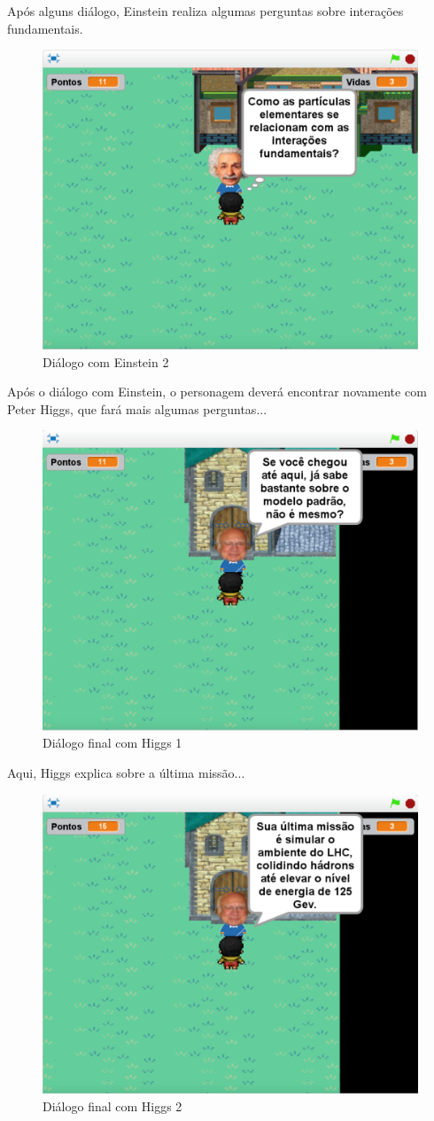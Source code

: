 \documentclass[12pt,fleqn]{book} %
\begin{document}
\newpage

Após alguns diálogo, Einstein realiza algumas perguntas sobre interações fundamentais.

\begin{figure}[h]
	\centering
	\includegraphics[width=0.65 \textwidth]{Produto/jogo_16}
	\caption{Diálogo com Einstein 2}
	\label{fig:app_a:jogo16}
\end{figure}


Após o diálogo com Einstein, o personagem deverá encontrar novamente com Peter Higgs, que fará mais algumas perguntas...

\begin{figure}[h]
	\centering
	\includegraphics[width=0.65 \textwidth]{Produto/jogo_17}
	\caption{Diálogo final com Higgs 1}
	\label{fig:app_a:jogo17}
\end{figure}

\newpage

Aqui, Higgs explica sobre a última missão...

\begin{figure}[h]
	\centering
	\includegraphics[width=0.65 \textwidth]{Produto/jogo_18}
	\caption{Diálogo final com Higgs 2}
	\label{fig:app_a:jogo18}
\end{figure}
\end{document}
